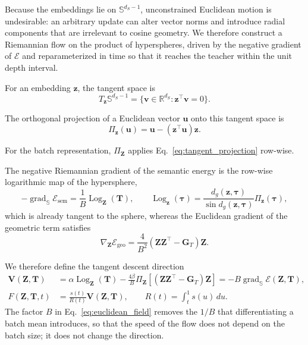 \documentclass[11pt]{article}
\begin{document}
Because the embeddings lie on
$\mathbb{S}^{d_S-1}$, unconstrained Euclidean motion is undesirable:
an arbitrary update can alter vector norms and introduce radial components
that are irrelevant to cosine geometry. We therefore construct a
Riemannian flow on the product of hyperspheres, driven by the negative
gradient of $\mathcal{E}$ and reparameterized in time so that it reaches
the teacher within the unit depth interval.

For an embedding $\mathbf{z}$, the tangent space is
\begin{equation}
    T_{\mathbf{z}}\mathbb{S}^{d_S-1}
    =
    \{
        \mathbf{v}\in\mathbb{R}^{d_S}
        :
        \mathbf{z}^{\top}\mathbf{v}=0
    \}.
\end{equation}

The orthogonal projection of a Euclidean vector $\mathbf{u}$ onto this
tangent space is
\begin{equation}
    \Pi_{\mathbf{z}}(\mathbf{u})
    =
    \mathbf{u}
    -
    (\mathbf{z}^{\top}\mathbf{u})
    \mathbf{z}.
    \label{eq:tangent_projection}
\end{equation}

For the batch representation, $\Pi_{\mathbf{Z}}$ applies
Eq.~\eqref{eq:tangent_projection} row-wise.

The negative Riemannian gradient of the semantic energy is the row-wise
logarithmic map of the hypersphere,
\begin{equation}
    -\operatorname{grad}_{\mathbb{S}}
    \mathcal{E}_{\mathrm{sem}}
    =
    \frac{1}{B}\operatorname{Log}_{\mathbf{Z}}(\mathbf{T}),
    \qquad
    \operatorname{Log}_{\mathbf{z}}(\boldsymbol{\tau})
    =
    \frac{d_g(\mathbf{z},\boldsymbol{\tau})}
         {\sin d_g(\mathbf{z},\boldsymbol{\tau})}
    \Pi_{\mathbf{z}}(\boldsymbol{\tau}),
    \label{eq:log_map}
\end{equation}
which is already tangent to the sphere, whereas the Euclidean gradient of
the geometric term satisfies
\begin{equation}
    \nabla_{\mathbf{Z}}
    \mathcal{E}_{\mathrm{geo}}
    =
    \frac{4}{B^2}
    \left(
        \mathbf{Z}\mathbf{Z}^{\top}
        -
        \mathbf{G}_T
    \right)\mathbf{Z}.
    \label{eq:geo_gradient}
\end{equation}

We therefore define the tangent descent direction
\begin{align}
    \mathbf{V}(\mathbf{Z},\mathbf{T})
    &=
    \alpha\operatorname{Log}_{\mathbf{Z}}(\mathbf{T})
    -
    \frac{4\beta}{B}
    \Pi_{\mathbf{Z}}
    \left[
    \left(
        \mathbf{Z}\mathbf{Z}^{\top}
        -
        \mathbf{G}_T
    \right)\mathbf{Z}
    \right]
    =
    -B\operatorname{grad}_{\mathbb{S}}\mathcal{E}(\mathbf{Z},\mathbf{T}),
    \label{eq:euclidean_field}\\
    F(\mathbf{Z},\mathbf{T},t)
    &=
    \frac{s(t)}{R(t)}
    \mathbf{V}(\mathbf{Z},\mathbf{T}),
    \qquad
    R(t)=\int_t^1 s(u)\,du .
    \label{eq:vector_field}
\end{align}
The factor $B$ in Eq.~\eqref{eq:euclidean_field} removes the $1/B$ that
differentiating a batch mean introduces, so that the speed of the flow does
not depend on the batch size; it does not change the direction.
\end{document}
